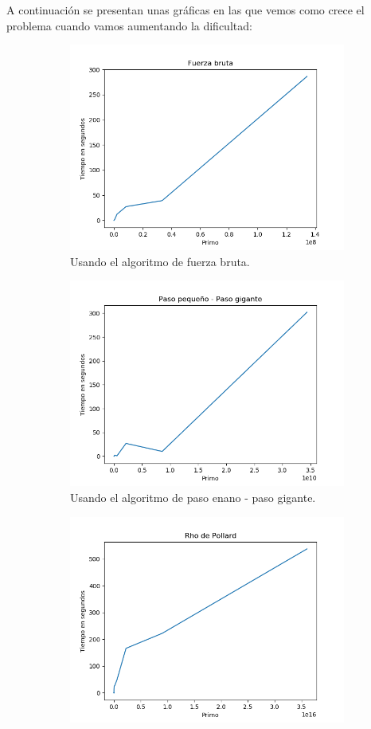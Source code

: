 \documentclass[12pt,spanish]{article}
\begin{document}
A continuación se presentan unas gráficas en las que vemos como crece el problema cuando vamos aumentando la dificultad: 
\begin{figure}[!htbp]			
	\begin{subfigure}{.5\textwidth}
		\centering
		\includegraphics[width=.8\linewidth]{log_bf}
		\caption{Usando el algoritmo de fuerza bruta.}
		\label{fig:sfig11}
	\end{subfigure}
	\begin{subfigure}{.5\textwidth}
		\centering
		\includegraphics[width=.8\linewidth]{log_pe}
		\caption{Usando el algoritmo de paso enano - paso gigante.}
		\label{fig:sfig12}
	\end{subfigure}
	\begin{subfigure}{.5\textwidth}
		\centering
		\includegraphics[width=.8\linewidth]{log_ro}

\end{subfigure}
\end{figure}
\end{document}
